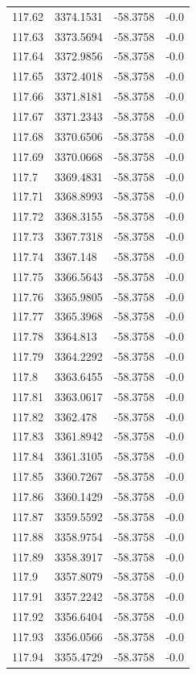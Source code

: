 \begin{table}[H]
\begin{tabular}{llll}
117.62 & 3374.1531 & -58.3758 & -0.0 \\
117.63 & 3373.5694 & -58.3758 & -0.0 \\
117.64 & 3372.9856 & -58.3758 & -0.0 \\
117.65 & 3372.4018 & -58.3758 & -0.0 \\
117.66 & 3371.8181 & -58.3758 & -0.0 \\
117.67 & 3371.2343 & -58.3758 & -0.0 \\
117.68 & 3370.6506 & -58.3758 & -0.0 \\
117.69 & 3370.0668 & -58.3758 & -0.0 \\
117.7 & 3369.4831 & -58.3758 & -0.0 \\
117.71 & 3368.8993 & -58.3758 & -0.0 \\
117.72 & 3368.3155 & -58.3758 & -0.0 \\
117.73 & 3367.7318 & -58.3758 & -0.0 \\
117.74 & 3367.148 & -58.3758 & -0.0 \\
117.75 & 3366.5643 & -58.3758 & -0.0 \\
117.76 & 3365.9805 & -58.3758 & -0.0 \\
117.77 & 3365.3968 & -58.3758 & -0.0 \\
117.78 & 3364.813 & -58.3758 & -0.0 \\
117.79 & 3364.2292 & -58.3758 & -0.0 \\
117.8 & 3363.6455 & -58.3758 & -0.0 \\
117.81 & 3363.0617 & -58.3758 & -0.0 \\
117.82 & 3362.478 & -58.3758 & -0.0 \\
117.83 & 3361.8942 & -58.3758 & -0.0 \\
117.84 & 3361.3105 & -58.3758 & -0.0 \\
117.85 & 3360.7267 & -58.3758 & -0.0 \\
117.86 & 3360.1429 & -58.3758 & -0.0 \\
117.87 & 3359.5592 & -58.3758 & -0.0 \\
117.88 & 3358.9754 & -58.3758 & -0.0 \\
117.89 & 3358.3917 & -58.3758 & -0.0 \\
117.9 & 3357.8079 & -58.3758 & -0.0 \\
117.91 & 3357.2242 & -58.3758 & -0.0 \\
117.92 & 3356.6404 & -58.3758 & -0.0 \\
117.93 & 3356.0566 & -58.3758 & -0.0 \\
117.94 & 3355.4729 & -58.3758 & -0.0 \\

\end{tabular}
\end{table}

